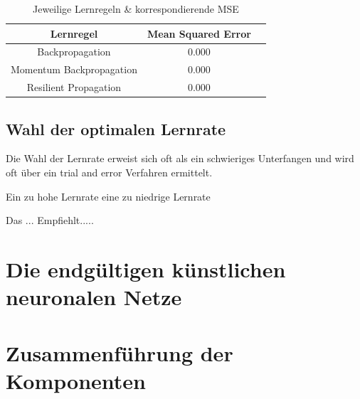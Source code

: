 \begin{table}[H]
  \centering
  \begin{tabular}{|c|c|c|}
  \hline 
  \rule[0ex]{0pt}{2.5ex} Lernregel & Mean Squared Error \\ 
  \hline 
  \rule[0ex]{0pt}{2.5ex} Backpropagation & 0.000 \\ 
  \hline 
  \rule[0ex]{0pt}{2.5ex} Momentum Backpropagation & 0.000\\ 
  \hline 
  \rule[0ex]{0pt}{2.5ex} Resilient Propagation & 0.000 \\ 
  \hline 
  \end{tabular} 
  \caption{Jeweilige Lernregeln \& korrespondierende MSE}
  \label{tab:tab3}
\end{table}


\subsection{Wahl der optimalen Lernrate}
\label{subsection:Wahl der optimalen Lernrate}

Die Wahl der Lernrate erweist sich oft als ein schwieriges Unterfangen und wird oft über ein trial and error Verfahren ermittelt. 

Ein zu hohe Lernrate 
eine zu niedrige Lernrate


Das ... Empfiehlt.....


\section{Die endgültigen künstlichen neuronalen Netze}

\section{Zusammenführung der Komponenten}
